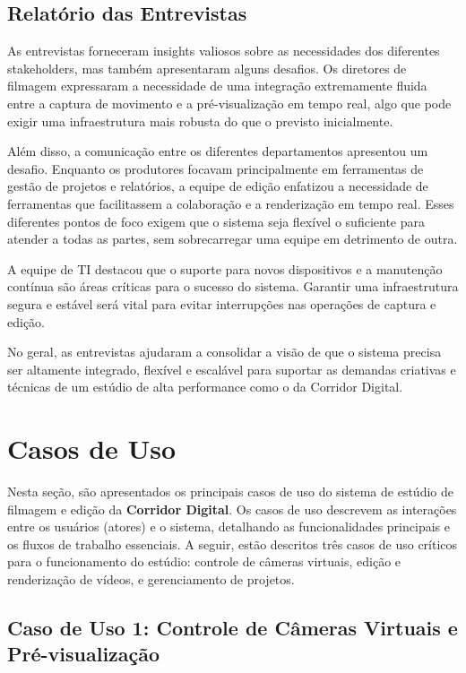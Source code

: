 \subsection{Relatório das Entrevistas}

As entrevistas forneceram insights valiosos sobre as necessidades dos diferentes stakeholders, mas também apresentaram alguns desafios. Os diretores de filmagem expressaram a necessidade de uma integração extremamente fluida entre a captura de movimento e a pré-visualização em tempo real, algo que pode exigir uma infraestrutura mais robusta do que o previsto inicialmente.

Além disso, a comunicação entre os diferentes departamentos apresentou um desafio. Enquanto os produtores focavam principalmente em ferramentas de gestão de projetos e relatórios, a equipe de edição enfatizou a necessidade de ferramentas que facilitassem a colaboração e a renderização em tempo real. Esses diferentes pontos de foco exigem que o sistema seja flexível o suficiente para atender a todas as partes, sem sobrecarregar uma equipe em detrimento de outra.

A equipe de TI destacou que o suporte para novos dispositivos e a manutenção contínua são áreas críticas para o sucesso do sistema. Garantir uma infraestrutura segura e estável será vital para evitar interrupções nas operações de captura e edição.

No geral, as entrevistas ajudaram a consolidar a visão de que o sistema precisa ser altamente integrado, flexível e escalável para suportar as demandas criativas e técnicas de um estúdio de alta performance como o da Corridor Digital.


\section{Casos de Uso}

Nesta seção, são apresentados os principais casos de uso do sistema de estúdio de filmagem e edição da \textbf{Corridor Digital}. Os casos de uso descrevem as interações entre os usuários (atores) e o sistema, detalhando as funcionalidades principais e os fluxos de trabalho essenciais. A seguir, estão descritos três casos de uso críticos para o funcionamento do estúdio: controle de câmeras virtuais, edição e renderização de vídeos, e gerenciamento de projetos.

\subsection{Caso de Uso 1: Controle de Câmeras Virtuais e Pré-visualização}

